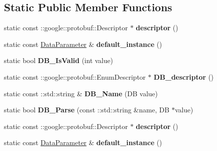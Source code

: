\subsection*{Static Public Member Functions}
\begin{DoxyCompactItemize}
\item 
\mbox{\label{classcaffe_1_1_data_parameter_ab84b98ef6c2de7af3cc165418f3f3813}} 
static const \+::google\+::protobuf\+::\+Descriptor $\ast$ {\bfseries descriptor} ()
\item 
\mbox{\label{classcaffe_1_1_data_parameter_a25e5b9b44abb65a3ecc4e722ef004b7a}} 
static const \mbox{\hyperlink{classcaffe_1_1_data_parameter}{Data\+Parameter}} \& {\bfseries default\+\_\+instance} ()
\item 
\mbox{\label{classcaffe_1_1_data_parameter_a13ddf96e6817764d8f2f19f015e70298}} 
static bool {\bfseries D\+B\+\_\+\+Is\+Valid} (int value)
\item 
\mbox{\label{classcaffe_1_1_data_parameter_aeadf67426e0ac1d595cab85521014474}} 
static const \+::google\+::protobuf\+::\+Enum\+Descriptor $\ast$ {\bfseries D\+B\+\_\+descriptor} ()
\item 
\mbox{\label{classcaffe_1_1_data_parameter_a98b72d95d27b36490ea4c724287e97fe}} 
static const \+::std\+::string \& {\bfseries D\+B\+\_\+\+Name} (DB value)
\item 
\mbox{\label{classcaffe_1_1_data_parameter_aedc48e3721c1f9eabcc94bfa7f59d136}} 
static bool {\bfseries D\+B\+\_\+\+Parse} (const \+::std\+::string \&name, DB $\ast$value)
\item 
\mbox{\label{classcaffe_1_1_data_parameter_a8951013f5ca331c267d2974099f81531}} 
static const \+::google\+::protobuf\+::\+Descriptor $\ast$ {\bfseries descriptor} ()
\item 
\mbox{\label{classcaffe_1_1_data_parameter_a93f7016e2e198655fccccf4792e308a1}} 
static const \mbox{\hyperlink{classcaffe_1_1_data_parameter}{Data\+Parameter}} \& {\bfseries default\+\_\+instance} ()

\end{DoxyCompactItemize}
